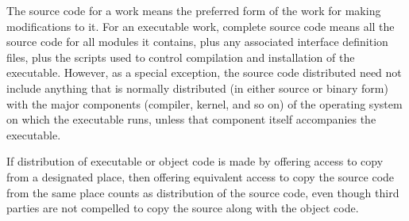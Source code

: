 \documentclass[letterpaper,10pt,english]{sphinxmanual}
\begin{document}
\sphinxAtStartPar
The source code for a work means the preferred form of the work for making modifications to it. For an executable work, complete source code means all the source code for all modules it contains, plus any associated interface definition files, plus the scripts used to control compilation and installation of the executable. However, as a special exception, the source code distributed need not include anything that is normally distributed (in either source or binary form) with the major components (compiler, kernel, and so on) of the operating system on which the executable runs, unless that component itself accompanies the executable.

\sphinxAtStartPar
If distribution of executable or object code is made by offering access to copy from a designated place, then offering equivalent access to copy the source code from the same place counts as distribution of the source code, even though third parties are not compelled to copy the source along with the object code.
\end{document}
